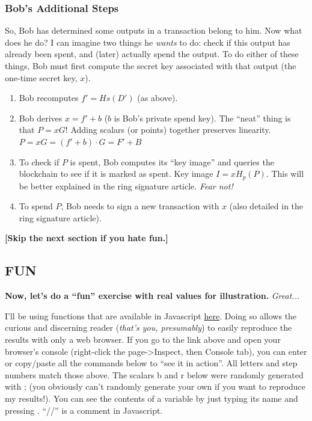 \subsubsection{Bob's Additional Steps}
So, Bob has determined some outputs in a transaction belong to him. Now what does he do? I can imagine two things he \emph{wants} to do: check if this output has already been spent, and (later) actually spend the output. To do either of these things, Bob must first compute the secret key associated with that output (the one-time secret key, \(x\)).
	\begin{enumerate}
		\item Bob recomputes \(f' = Hs(D')\) (as above).
		\item Bob derives \(x = f' + b\) (\(b\) is Bob's private spend key). The ``neat'' thing is that \(P = xG\)! Adding scalars (or points) together preserves linearity. \(P = xG = (f' + b)\cdot G = F' + B\)
		\item To check if \(P\) is spent, Bob computes its ``key image'' and queries the blockchain to see if it is marked as spent. Key image \(I = xH_p(P)\). This will be better explained in the ring signature article. \emph{Fear not!}
		\item To spend \(P\), Bob needs to sign a new transaction with \(x\) (also detailed in the ring signature article).
	\end{enumerate}

	\textbf{[Skip the next section if you hate fun.]}
\subsection{FUN}
\textbf{Now, let's do a ``fun'' exercise with real values for illustration.} \emph{Great...}\par

I'll be using functions that are available in Javascript \href{https://xmr.llcoins.net/}{here}. Doing so allows the curious and discerning reader (\textit{that's you, presumably}) to easily reproduce the results with only a web browser. If you go to the link above and open your browser's console (right-click the page->Inspect, then Console tab), you can enter or copy/paste all the commands below to ``see it in action''. All letters and step numbers match those  above. The scalars b and r below were randomly generated with ; (you obviously can't randomly generate your own if you want to reproduce my results!). You can see the contents of a variable by just typing its name and pressing . ``//'' is a comment in Javascript.\par

